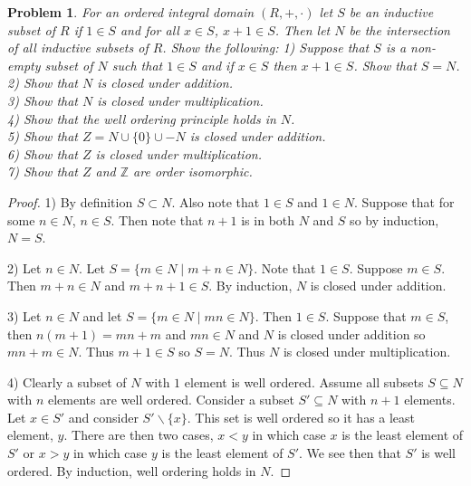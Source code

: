 \documentclass{article}
\newtheorem{problem}{Problem}
\begin{document}
\begin{flushleft}
\begin{problem}
For an ordered integral domain $(R, +, \cdot)$ let $S$ be an inductive subset of $R$ if $1 \in S$ and for all $x \in S$, $x + 1 \in S$. Then let $N$ be the intersection of all inductive subsets of $R$. Show the following:
1) Suppose that $S$ is a non-empty subset of $N$ such that $1 \in S$ and if $x \in S$ then $x + 1 \in S$. Show that $S = N$.\\
2) Show that $N$ is closed under addition.\\
3) Show that $N$ is closed under multiplication.\\
4) Show that the well ordering principle holds in $N$.\\
5) Show that $Z = N \cup \{0\} \cup -N$ is closed under addition.\\
6) Show that $Z$ is closed under multiplication.\\
7) Show that $Z$ and $\mathbb{Z}$ are order isomorphic.\newline
\end{problem}
\begin{proof}
1) By definition $S \subset N$. Also note that $1 \in S$ and $1 \in N$. Suppose that for some $n \in N$, $n \in S$. Then note that $n+1$ is in both $N$ and $S$ so by induction, $N = S$.\newline

2) Let $n \in N$. Let $S = \{m \in N \mid m + n \in N\}$. Note that $1 \in S$. Suppose $m \in S$. Then $m+n \in N$ and $m+n+1 \in S$. By induction, $N$ is closed under addition.\newline

3) Let $n \in N$ and let $S = \{m \in N \mid mn \in N\}$. Then $1 \in S$. Suppose that $m \in S$, then $n(m+1) = mn+m$ and $mn \in N$ and $N$ is closed under addition so $mn + m \in N$. Thus $m+1 \in S$ so $S = N$. Thus $N$ is closed under multiplication.\newline

4) Clearly a subset of $N$ with $1$ element is well ordered. Assume all subsets $S \subseteq N$ with $n$ elements are well ordered. Consider a subset $S' \subseteq N$ with $n+1$ elements. Let $x \in S'$ and consider $S' \backslash \{x\}$. This set is well ordered so it has a least element, $y$. There are then two cases, $x < y$ in which case $x$ is the least element of $S'$ or $x > y$ in which case $y$ is the least element of $S'$. We see then that $S'$ is well ordered. By induction, well ordering holds in $N$.\newline


\end{proof}
\end{flushleft}
\end{document}
